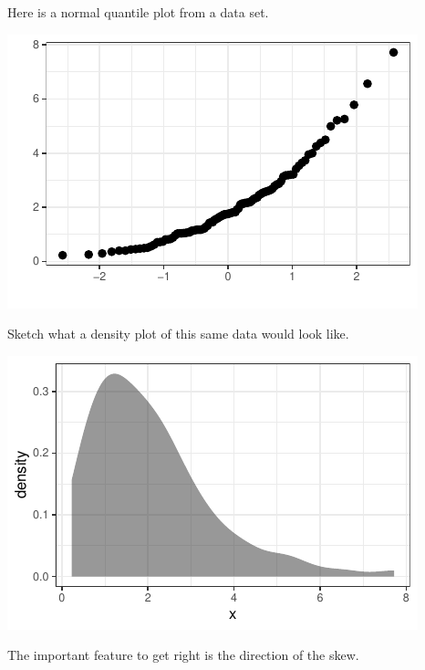 \documentclass[twoside]{book}\usepackage[]{graphicx}\usepackage[]{xcolor}
\makeatletter
\def\maxwidth{ %
  \ifdim\Gin@nat@width>\linewidth
    \linewidth
  \else
    \Gin@nat@width
  \fi
}
\newenvironment{knitrout}{}{} %
\makeatother
\begin{document}
\begin{problem}
Here is a normal quantile plot from a data set.
\begin{knitrout}
\color{fgcolor}

{\centering \includegraphics[width=\maxwidth]{figures/fig-unnamed-chunk-164-1} 

}



\end{knitrout}
Sketch what a density plot of this same data would look like.
\end{problem}

\begin{solution}
\begin{knitrout}
\color{fgcolor}

{\centering \includegraphics[width=\maxwidth]{figures/fig-unnamed-chunk-165-1} 

}



\end{knitrout}
The important feature to get right is the direction of the skew.
\end{solution}
\end{document}
